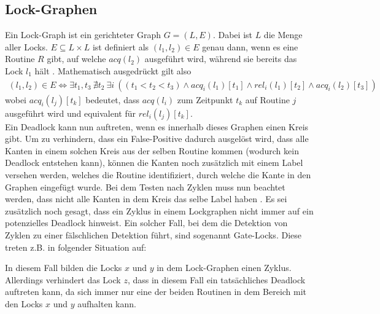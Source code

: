 \subsection{Lock-Graphen}\label{Kap::Theo:Lockgraph}
Ein Lock-Graph ist ein gerichteter Graph $G = (L, E)$. Dabei ist $L$ die Menge 
aller Locks. $E \subseteq L \times L$ ist definiert als $(l_1, l_2) \in E$ genau 
dann, wenn es eine Routine $R$ gibt, auf welche $acq(l_2)$ ausgeführt wird, während sie 
bereits das Lock $l_1$ hält \cite{bensalem}. Mathematisch ausgedrückt gilt also 
\begin{align*}
    (l_1, l_2) \in E \Leftrightarrow \exists t_1, t_3\ \nexists t_2\ \exists i\ ((t_1 < t_2 < t_3) \land acq_i(l_1)[t_1] \land rel_i(l_1)[t_2] \land  acq_i(l_2)[t_3])
\end{align*}
wobei $acq_i(l_j)[t_k]$ bedeutet, dass $acq(l_i)$ zum Zeitpunkt $t_k$ auf Routine 
$j$ ausgeführt wird und equivalent für $rel_i(l_j)[t_k]$.\\
Ein Deadlock kann nun auftreten, wenn es innerhalb dieses Graphen einen Kreis 
gibt. Um zu verhindern, dass ein False-Positive dadurch ausgelöst wird, dass 
alle Kanten in einem solchen Kreis aus der selben Routine kommen (wodurch kein 
Deadlock entstehen kann), können die Kanten noch zusätzlich mit einem Label 
versehen werden, welches die Routine identifiziert, durch welche die Kante in 
den Graphen eingefügt wurde. Bei dem Testen nach Zyklen muss nun beachtet 
werden, dass nicht alle Kanten in dem Kreis das selbe Label haben 
\cite{bensalem}. Es sei zusätzlich noch gesagt, dass ein Zyklus in einem 
Lockgraphen nicht immer auf ein potenzielles Deadlock hinweist. Ein solcher 
Fall, bei dem die Detektion von Zyklen zu einer fälschlichen Detektion 
führt, sind sogenannt Gate-Locks. Diese treten z.B. in folgender Situation
auf:
\begin{table}[H]
    
\end{table}
In diesem Fall bilden die Locks $x$ und $y$ in dem Lock-Graphen einen Zyklus. 
Allerdings verhindert das Lock $z$, dass in diesem Fall ein tatsächliches 
Deadlock auftreten kann, da sich immer nur eine der beiden Routinen 
in dem Bereich mit den Locks $x$ und $y$ aufhalten kann.


